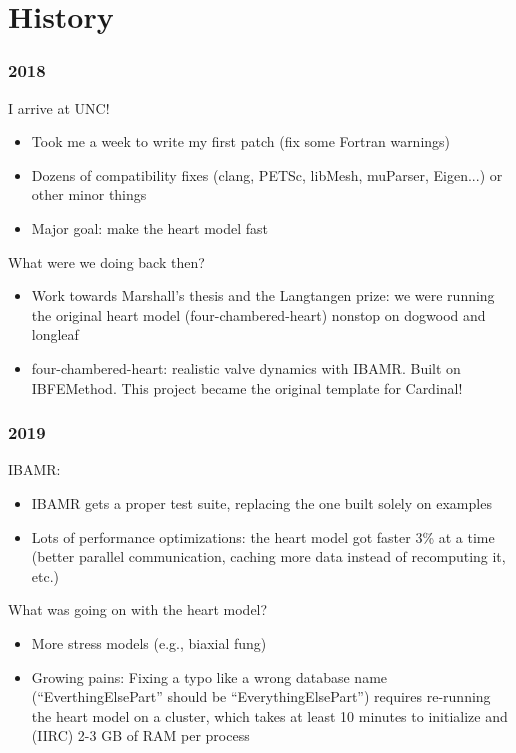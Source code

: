 \documentclass[8pt]{beamer}
\begin{document}
\section{History}
\begin{frame}
  \frametitle{2018}
  I arrive at UNC!
  \begin{itemize}
    \item[$\blacksquare$] Took me a week to write my first patch (fix some Fortran warnings)
    \item[$\blacksquare$] Dozens of compatibility fixes (clang, PETSc, libMesh, muParser, Eigen...)
      or other minor things
    \item[$\blacksquare$] Major goal: make the heart model fast
  \end{itemize}

  \vfill

  What were we doing back then?
  \begin{itemize}
    \item[$\blacksquare$] Work towards Marshall's thesis and the Langtangen prize: we were
      running the original heart model (four-chambered-heart) nonstop on dogwood
      and longleaf

    \item[$\blacksquare$] four-chambered-heart: realistic valve dynamics with IBAMR. Built on
      IBFEMethod. This project became the original template for Cardinal!
  \end{itemize}
\end{frame}

\begin{frame}
  \frametitle{2019}
  IBAMR:
  \begin{itemize}
    \item[$\blacksquare$] IBAMR gets a proper test suite, replacing the one built solely on examples
    \item[$\blacksquare$] Lots of performance optimizations: the heart model got faster 3\% at a time (better parallel communication, caching more data instead of recomputing it, etc.)
  \end{itemize}
  \vfill

  What was going on with the heart model?
  \begin{itemize}
    \item[$\blacksquare$] More stress models (e.g., biaxial fung)
    \item[$\blacksquare$] Growing pains: Fixing a typo like a wrong database name
      (``EverthingElsePart'' should be ``EverythingElsePart'') requires
      re-running the heart model on a cluster, which takes at least 10 minutes
      to initialize and (IIRC) 2-3 GB of RAM per process
  \end{itemize}
\end{frame}
\end{document}
